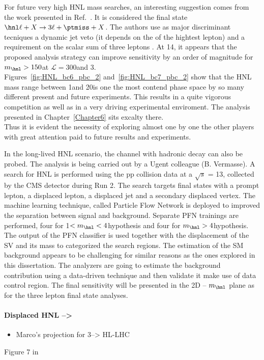 For future very high HNL mass searches, an interesting suggestion comes from
the work presented in Ref.~\cite{Pascoli_2019}. It is considered the
final state $\hnl \ell + X\rightarrow 3\ell + \ptmiss + X$. The
authors use as major
discriminant tecniques a dynamic
jet veto (\ie it depends on the \pt of the hightest \pt lepton) and a
requirement on the scalar sum of three leptons \pt. At 14\TeV, it appears that
the proposed analysis strategy can
improve sensitivity by an order of
magnitude for $m_\hnl > 150$\GeV at $\mathcal{L} = 300$\fbinv and
3\abinv. \\

Figures~\ref{fig:HNL_bc6_pbc_2} and~\ref{fig:HNL_bc7_pbc_2} show that
the HNL mass range between 1\GeV and 20\GeV is one the most contend phase
space by so many different present and future experiments. This
results in a quite vigorous competition as well as in a very driving
experimental enviroment. The analysis presented in Chapter~\ref{Chapter6} sits excalty there. \\
Thus it is evident the necessity of exploring almost one by one the
other players with great attention paid to future results and experiments.

In the long-lived HNL scenario, the channel with hadronic \PW decay
can also be probed. The analysis is being carried out by a Ugent
colleague (B. Vermasse). A search for HNL is performed using the pp collision
data at a $\sqrt{s}$ = 13\TeV, collected by the CMS detector during Run
2. The search targets final states with a prompt lepton, a displaced lepton, a
displaced jet and a secondary displaced vertex. The machine
learning technique, called Particle Flow Network is deployed to
improved the separation between signal and background.
Separate PFN trainings
are performed, four for 1\GeV $< m_\hnl < 4$\GeV hypothesis and four for $m_\hnl > 4$\GeV hypothesis.
The output of the PFN classifier is used together with the
displacement of the SV and its mass to categorized the search regions.
The estimation of the SM background appears to be challenging for
similar reasons as the ones explored in this dissertation. The
analyzers are going to estimate the background contribution using a data-driven 
technique and then validate it make use of data control region. The
final sensitivity will be presented in the 2D \mixpar -- $m_\hnl$
plane as for the three lepton final state analyses.




\paragraph{Displaced HNL -->}
\begin{itemize}
\item Marco's projection for 3\abinv --> HL-LHC
\end{itemize}
Figure 7 in ~\cite{Alimena_2020}

